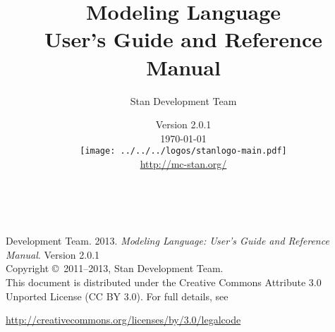 \title{\Huge\bf \Stan Modeling Language \\[4pt] {\LARGE User's Guide
    and Reference Manual}}
\author{Stan Development Team}

\date{
\Stan Version
2.0.1
\\[8pt] {\small \today}
\\[36pt]
{
\vfill
\texttt{[image: ../../../logos/stanlogo-main.pdf]}}
\\
{\small \url{http://mc-stan.org/}}
}
\maketitle

\newpage
\thispagestyle{empty}
\mbox{ }
\vfill
\begin{center}
\begin{minipage}[t]{0.75\textwidth}
\small
\Stan Development Team. 2013.  
{\it \Stan Modeling Language: User's Guide and Reference Manual}. Version
2.0.1
\vspace*{20pt}
\mbox{ }
\\
Copyright \copyright \ 2011--2013, Stan Development Team.
\vspace*{28pt}
\mbox{} \\
This document is distributed under the Creative Commons Attribute 3.0
Unported License (CC BY 3.0).  For full details, see
\begin{center}
\url{http://creativecommons.org/licenses/by/3.0/legalcode} 
\end{center}
\end{minipage}
\vspace*{24pt}
\mbox{ }
\end{center}
